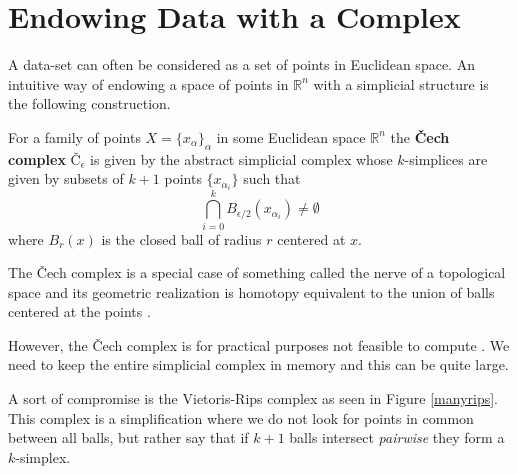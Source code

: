 \section{Endowing Data with a Complex}

A data-set can often be considered as a set of points in Euclidean space. An intuitive way of endowing a space of points in $\mathbb{R}^{n}$ with a simplicial structure is the following construction.
\begin{definition}
For a family of points $X=\{x_{\alpha}\}_{\alpha}$ in some Euclidean space $\mathbb{R}^{n}$ the \textbf{Čech complex}
$\text{Č}_{\epsilon}$ is given by the abstract simplicial complex whose $k$-simplices are given by subsets of $k+1$ points $\{x_{\alpha_{i}}\}$ such that \[\bigcap^{k}_{i=0} B_{\epsilon/2}(x_{\alpha_{i}}) \neq \emptyset\] where $B_{r}(x)$ is the closed ball of radius $r$ centered at $x$.
\end{definition}
The Čech complex is a special case of something called the nerve of a topological space and its geometric realization is homotopy equivalent to the union of balls centered at the points \cite[p. ~71]{edels}.

However, the Čech complex is for practical purposes not feasible to compute \cite{ghirst}. We need to keep the entire simplicial complex in memory and this can be quite large.

A sort of compromise is the Vietoris-Rips complex as seen in Figure \ref{manyrips}. This complex is a simplification where we do not look for points in common between all balls, but rather say that if $k+1$ balls intersect \textit{pairwise} they form a $k$-simplex.

